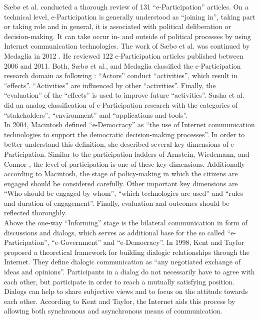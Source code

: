 S{\ae}b{\o} et al. \cite{Saebo_eParticipation} conducted a thorough review of 131 ``e-Participation'' articles. On a technical level, e-Participation is generally understood as ``joining in'', taking part or taking role and in general, it is associated with political deliberation or decision-making. It can take occur in- and outside  of political processes by using Internet communication technologies. The work of S{\ae}b{\o} et al. was continued by Medaglia in 2012 \cite{Medaglia2012_eParticipation}. He reviewed 122 e-Participation articles published between 2006 and 2011. Both, S{\ae}b{\o} et al., and Medaglia classified the e-Participation research domain as following : ``Actors'' conduct ``activities'', which result in ``effects''. ``Activities'' are influenced by other ``activities''. Finally, the ``evaluation'' of the ``effects'' is used to improve future ``activities''. Susha et al. \cite{Susha2012_eParticipation} did an analog classification of e-Participation research with the categories of ``stakeholders'', ``environment'' and ``applications and tools''.\\
In 2004, Macintosh \cite{Macintosh2004_eParticipation_characterization} defined ``e-Democracy'' as ``the use of Internet communication technologies to support the democratic decision-making processes''. In order to better understand this definition, she described several key dimensions of e-Participation. Similar to the participation ladders of Arnstein, Wiedemann, and Connor \cite{Arnstein1969_citizen_participation,Wiedemann1993355,Connor1988_new_ladder}, the level of participation is one of these key dimensions. Additionally according to Macintosh, the stage of policy-making in which the citizens are engaged should be considered carefully. Other important key dimensions are ``Who should be engaged by whom'', ``which technologies are used'' and ``rules and duration of engagement''. Finally, evaluation and outcomes should be reflected thoroughly.\\
Above the one-way ``Informing'' stage is the bilateral communication in form of discussions and dialogs, which serves as additional base for the so called ``e-Participation'', ``e-Government'' and ``e-Democracy''. In 1998, Kent and Taylor \cite{Kent1998_dialogic_relationships_through_www} proposed a theoretical framework for building dialogic relationships through the Internet. They define dialogic communication as ``any negotiated exchange of ideas and opinions''. Participants in a dialog do not necessarily have to agree with each other, but participate in order to reach a mutually satisfying position. Dialogs can help to share subjective views and to focus on the attitude towards each other. According to Kent and Taylor, the Internet aids this process by allowing both synchronous and asynchronous means of communication.\\
